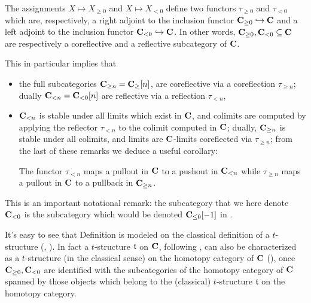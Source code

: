 \begin{remark}\label{trunfun}
The assignments $X\mapsto X_{\ge 0}$ and $X\mapsto X_{< 0}$ define two functors $\tau_{\ge 0}$ and $\tau_{<0}$ which are, respectively, a right adjoint to the inclusion functor $\mathbf{C}_{\ge 0}\hookrightarrow \mathbf{C}$ and a left adjoint to the inclusion functor $\mathbf{C}_{<0}\hookrightarrow \mathbf{C}$. In other words, $\mathbf{C}_{\ge 0},\mathbf{C}_{<0} \subseteq \mathbf{C}$ are respectively \cite[\textbf{1.2.1.5\hyp{}8}]{LurieHA} a coreflective and a reflective subcategory of $\mathbf{C}$.

This in particular implies that
\begin{itemize}
\item the full subcategories $\mathbf{C}_{\ge n}=\mathbf{C}_\ge[n]$, are coreflective via a coreflection $\tau_{\ge n}$; dually $\mathbf{C}_{<n}=\mathbf{C}_{<0}[n]$ are reflective via a reflection  $\tau_{< n}$,
\item $\mathbf{C}_{< n}$ is stable under all limits which exist in $\mathbf{C}$, and colimits are computed by applying the reflector $\tau_{< n}$ to the colimit computed in $\mathbf{C}$; dually, $\mathbf{C}_{\ge n}$ is stable under all colimits, and limits are $\mathbf{C}$-limits coreflected via $\tau_{\ge n}$; from the last of these remarks we deduce a useful corollary:
\begin{corollary}
The functor $\tau_{<n}$ maps a pullout in $\mathbf{C}$ to a pushout in $\mathbf{C}_{<n}$ while $\tau_{\geq n}$ maps a pullout in $\mathbf{C}$ to a pullback in $\mathbf{C}_{\geq n}$.
\end{corollary}
\end{itemize}
\end{remark}
\begin{notat}\marginnote{\textdbend}
This is an important notational remark: the subcategory that we here denote $\mathbf{C}_{<0}$ is the subcategory which would be denoted $\mathbf{C}_{\leq 0}[-1]$ in \cite{LurieHA}.
\end{notat}
\begin{remark}\label{our.1241}
It's easy to see that Definition  is modeled on the classical definition of a $t$\hyp{}structure (\cite{Kashiwara}, \cite{BBDPervers}). In fact a $t$\hyp{}structure $\mathfrak{t}$ on $\mathbf{C}$, following \cite{LurieHA}, can also be characterized as a $t$\hyp{}structure (in the classical sense) on the homotopy category of $\mathbf{C}$ (\cite[Def. \textbf{1.2.1.4}]{LurieHA}), once $\mathbf{C}_{\ge 0}, \mathbf{C}_{<0}$ are identified with the subcategories of the homotopy category of $\mathbf{C}$ spanned by those objects which belong to the (classical) $t$\hyp{}structure $\mathfrak{t}$ on the homotopy category. \end{remark}
